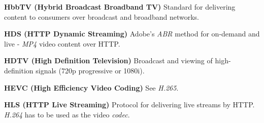 \smallskip
\textbf{HbbTV (Hybrid Broadcast Broadband TV)}
Standard for delivering content to consumers over broadcast and broadband networks.

\smallskip
\textbf{HDS (HTTP Dynamic Streaming)}
Adobe's \textit{ABR} method for on-demand and live - \textit{MP4} video content over HTTP.

\smallskip
\textbf{HDTV (High Definition Television)}
Broadcast and viewing of high-definition signals (720p progressive or 1080i).

\smallskip
\textbf{HEVC (High Efficiency Video Coding)}
See \textit{H.265}.

\smallskip
\textbf{HLS (HTTP Live Streaming)}
Protocol for delivering live streams by HTTP.  \textit{H.264} has to be used as the video \textit{codec}.
